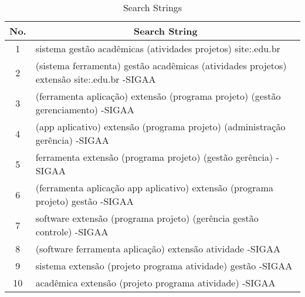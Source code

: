 \begin{table}
  \centering
  \caption{Search Strings}
  \label{tab:gl-strings}
  \footnotesize
  \begin{tabular}{c|l}
    \bottomrule
    \rowcolor[rgb]{0.753,0.753,0.753} \textbf{No.} & \multicolumn{1}{c}{\textbf{Search String}}                                                                                  \\
    \hline
    \rowcolor[rgb]{0.898,0.898,0.898} 1            & sistema gestão acadêmicas (atividades \textbar{} projetos) site:.edu.br                                                     \\
    2                                              & (sistema \textbar{} ferramenta) gestão acadêmicas (atividades \textbar{} projetos) extensão site:.edu.br -SIGAA             \\
    \rowcolor[rgb]{0.898,0.898,0.898} 3            & (ferramenta \textbar{} aplicação) extensão (programa \textbar{} projeto) (gestão \textbar{} gerenciamento) -SIGAA           \\
    4                                              & (app \textbar{} aplicativo) extensão (programa \textbar{} projeto) (administração \textbar{} gerência) -SIGAA               \\
    \rowcolor[rgb]{0.898,0.898,0.898} 5            & ferramenta extensão (programa \textbar{} projeto) (gestão \textbar{} gerência) -SIGAA                                       \\
    6                                              & (ferramenta \textbar{} aplicação \textbar{} app \textbar{} aplicativo) extensão (programa \textbar{} projeto) gestão -SIGAA \\
    \rowcolor[rgb]{0.898,0.898,0.898} 7            & software extensão (programa \textbar{} projeto) (gerência \textbar{} gestão \textbar{} controle) -SIGAA                     \\
    8                                              & (software \textbar{} ferramenta \textbar{} aplicação) extensão atividade -SIGAA                                             \\
    \rowcolor[rgb]{0.898,0.898,0.898} 9            & sistema extensão (projeto \textbar{} programa \textbar{} atividade) gestão -SIGAA                                           \\
    10                                             & acadêmica extensão (projeto \textbar{} programa \textbar{} atividade) -SIGAA                                                \\
    \toprule
  \end{tabular}
\end{table}